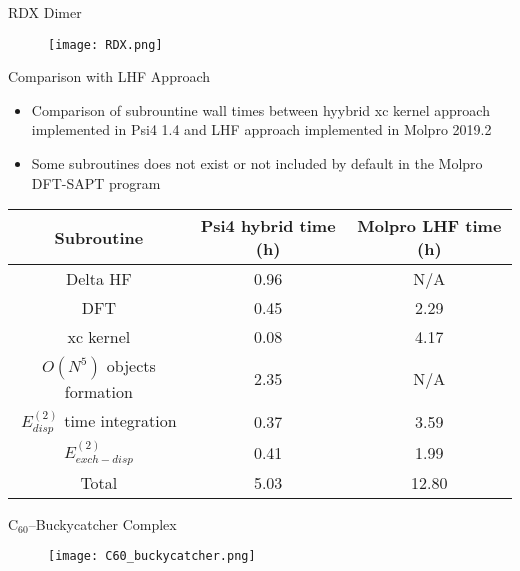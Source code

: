 \documentclass{beamer}
\begin{document}
        \begin{frame}{RDX Dimer}
            \begin{figure}
                \centering
                \texttt{[image: RDX.png]}
            \end{figure}
        \end{frame}

        \begin{frame}{Comparison with LHF Approach}
            \begin{itemize}
                \item Comparison of subrountine wall times between hyybrid xc kernel approach implemented in Psi4 1.4 and LHF approach implemented in Molpro 2019.2
                \item Some subroutines does not exist or not included by default in the Molpro DFT-SAPT program
            \end{itemize}
            \begin{table}
                \centering
                \begin{tabular}{c c c}
                    \hline
                    Subroutine & Psi4 hybrid time (h) & Molpro LHF time (h) \\ \hline
                    Delta HF & 0.96 & N/A \\ 
                    DFT & 0.45 & 2.29 \\ 
                    xc kernel & 0.08 & 4.17 \\ 
                    $O(N^5)$ objects formation & 2.35 & N/A \\ 
                    $E^{(2)}_{disp}$ time integration & 0.37 & 3.59 \\ 
                    $E^{(2)}_{exch-disp}$ & 0.41 & 1.99 \\ 
                    Total & 5.03 & 12.80 \\ \hline
                \end{tabular}
            \end{table}
        \end{frame}

        \begin{frame}{C$_{60}$--Buckycatcher Complex}
            \begin{figure}
                \centering
                \texttt{[image: C60\_buckycatcher.png]}
            \end{figure}
        \end{frame}
\end{document}
